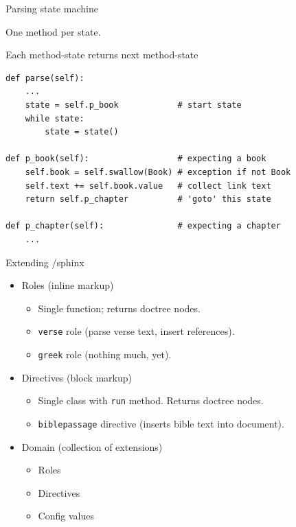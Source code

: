 \documentclass{beamer}
\begin{document}
\begin{frame}[fragile]{Parsing state machine}

One method per state.

Each method-state returns next method-state

\begin{verbatim}
def parse(self):
    ...
    state = self.p_book            # start state
    while state:
        state = state()
		
def p_book(self):                  # expecting a book
    self.book = self.swallow(Book) # exception if not Book
    self.text += self.book.value   # collect link text
    return self.p_chapter          # 'goto' this state
	
def p_chapter(self):               # expecting a chapter
    ...
\end{verbatim}
\end{frame}

\begin{frame}{Extending \rst/sphinx}

\begin{itemize}
\item Roles (inline markup)
\begin{itemize}
\item Single function; returns doctree nodes.
\item \texttt{verse} role (parse verse text, insert references).
\item \texttt{greek} role (nothing much, yet).
\end{itemize}
\item Directives (block markup)
\begin{itemize}
\item Single class with \texttt{run} method. Returns doctree nodes.
\item \texttt{biblepassage} directive (inserts bible text into document).
\end{itemize}
\item Domain (collection of extensions)
\begin{itemize}
\item Roles
\item Directives
\item Config values
\end{itemize}
\end{itemize}

\end{frame}
\end{document}
